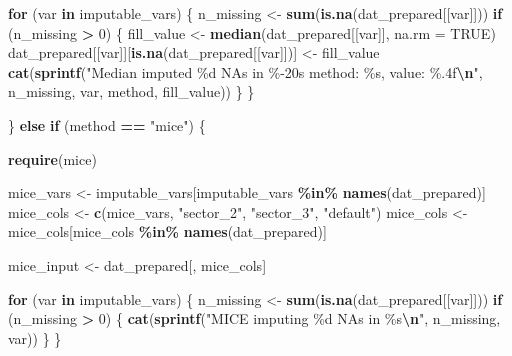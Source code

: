 \documentclass[
]{article}
\newenvironment{Shaded}{\begin{snugshade}}{\end{snugshade}}
\newcommand{\AttributeTok}[1]{\textcolor[rgb]{0.13,0.29,0.53}{#1}}
\newcommand{\ConstantTok}[1]{\textcolor[rgb]{0.56,0.35,0.01}{#1}}
\newcommand{\ControlFlowTok}[1]{\textcolor[rgb]{0.13,0.29,0.53}{\textbf{#1}}}
\newcommand{\DecValTok}[1]{\textcolor[rgb]{0.00,0.00,0.81}{#1}}
\newcommand{\FunctionTok}[1]{\textcolor[rgb]{0.13,0.29,0.53}{\textbf{#1}}}
\newcommand{\NormalTok}[1]{#1}
\newcommand{\OtherTok}[1]{\textcolor[rgb]{0.56,0.35,0.01}{#1}}
\newcommand{\SpecialCharTok}[1]{\textcolor[rgb]{0.81,0.36,0.00}{\textbf{#1}}}
\newcommand{\StringTok}[1]{\textcolor[rgb]{0.31,0.60,0.02}{#1}}
\begin{document}
\begin{Shaded}
\begin{Highlighting}[]
      \ControlFlowTok{for}\NormalTok{ (var }\ControlFlowTok{in}\NormalTok{ imputable\_vars) \{}
\NormalTok{        n\_missing }\OtherTok{\textless{}{-}} \FunctionTok{sum}\NormalTok{(}\FunctionTok{is.na}\NormalTok{(dat\_prepared[[var]]))}
        \ControlFlowTok{if}\NormalTok{ (n\_missing }\SpecialCharTok{\textgreater{}} \DecValTok{0}\NormalTok{) \{}
\NormalTok{          fill\_value }\OtherTok{\textless{}{-}} \FunctionTok{median}\NormalTok{(dat\_prepared[[var]], }\AttributeTok{na.rm =} \ConstantTok{TRUE}\NormalTok{)}
\NormalTok{          dat\_prepared[[var]][}\FunctionTok{is.na}\NormalTok{(dat\_prepared[[var]])] }\OtherTok{\textless{}{-}}\NormalTok{ fill\_value}
          \FunctionTok{cat}\NormalTok{(}\FunctionTok{sprintf}\NormalTok{(}\StringTok{"Median imputed \%d NAs in \%{-}20s method: \%s, value: \%.4f}\SpecialCharTok{\textbackslash{}n}\StringTok{"}\NormalTok{,}
\NormalTok{            n\_missing, var, method, fill\_value))}
\NormalTok{        \}}
\NormalTok{      \}}
      
\NormalTok{    \} }\ControlFlowTok{else} \ControlFlowTok{if}\NormalTok{ (method }\SpecialCharTok{==} \StringTok{"mice"}\NormalTok{) \{}
      
      \FunctionTok{require}\NormalTok{(mice)}
      
\NormalTok{      mice\_vars }\OtherTok{\textless{}{-}}\NormalTok{ imputable\_vars[imputable\_vars }\SpecialCharTok{\%in\%} \FunctionTok{names}\NormalTok{(dat\_prepared)]}
\NormalTok{      mice\_cols }\OtherTok{\textless{}{-}} \FunctionTok{c}\NormalTok{(mice\_vars, }\StringTok{"sector\_2"}\NormalTok{, }\StringTok{"sector\_3"}\NormalTok{, }\StringTok{"default"}\NormalTok{)}
\NormalTok{      mice\_cols }\OtherTok{\textless{}{-}}\NormalTok{ mice\_cols[mice\_cols }\SpecialCharTok{\%in\%} \FunctionTok{names}\NormalTok{(dat\_prepared)]}
      
\NormalTok{      mice\_input }\OtherTok{\textless{}{-}}\NormalTok{ dat\_prepared[, mice\_cols]}
      
      \ControlFlowTok{for}\NormalTok{ (var }\ControlFlowTok{in}\NormalTok{ imputable\_vars) \{}
\NormalTok{        n\_missing }\OtherTok{\textless{}{-}} \FunctionTok{sum}\NormalTok{(}\FunctionTok{is.na}\NormalTok{(dat\_prepared[[var]]))}
        \ControlFlowTok{if}\NormalTok{ (n\_missing }\SpecialCharTok{\textgreater{}} \DecValTok{0}\NormalTok{) \{}
          \FunctionTok{cat}\NormalTok{(}\FunctionTok{sprintf}\NormalTok{(}\StringTok{"MICE imputing \%d NAs in \%s}\SpecialCharTok{\textbackslash{}n}\StringTok{"}\NormalTok{, n\_missing, var))}
\NormalTok{        \}}
\NormalTok{      \}}
      

\end{Highlighting}
\end{Shaded}
\end{document}
